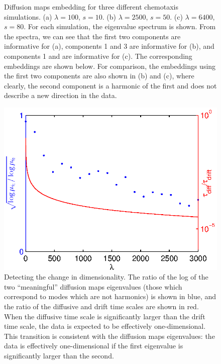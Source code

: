 \documentclass[preprint]{elsarticle}
\begin{document}
\begin{figure}
\begin{subfigure}[t]{0.35\textwidth}
\caption{}
\end{subfigure}
%
\caption{Diffusion maps embedding for three different chemotaxis simulations. (a) $\lambda = 100$, $s = 10$. (b) $\lambda = 2500$, $s = 50$. (c) $\lambda = 6400$, $s = 80$. For each simulation, the eigenvalue spectrum is shown. From the spectra, we can see that the first two components are informative for (a), components 1 and 3 are informative for (b), and components 1 and  are informative for (c). The corresponding embeddings are shown below. For comparison, the embeddings using the first two components are also shown in (b) and (c), where clearly, the second component is a harmonic of the first and does not describe a new direction in the data. }
%
\label{fig:chemotaxis_simulations_harmonics}
\end{figure}

\begin{figure}[t]
%
\centering
\includegraphics[width=\textwidth]{chemotaxis_compare_timescales_evals}
%
\caption{Detecting the change in dimensionality. The ratio of the log of the two ``meaningful'' diffusion maps eigenvalues (those which correspond to modes which are not harmonics) is shown in blue, and the ratio of the diffusive and drift time scales are shown in red. When the diffusive time scale is significantly larger than the drift time scale, the data is expected to be effectively one-dimensional. This transition is consistent with the diffusion maps eigenvalues: the data is effectively one-dimensional if the first eigenvalue is significantly larger than the second. }
%
\label{fig:chemotaxis_compare_timescales_evals}
%
\end{figure}
\end{document}
